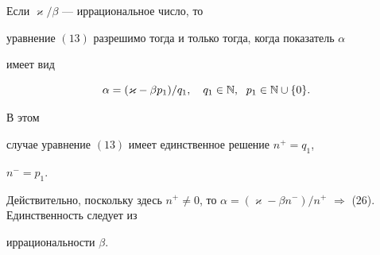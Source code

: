 \begin{lem}


Если $\varkappa/\beta$ --- иррациональное число, то


уравнение $(13)$ разрешимо тогда и только тогда, когда показатель $\alpha$


имеет вид


\begin{equation}


\alpha = (\varkappa-\beta


p_{1})/q_{1},\quad q_{1}\in\Bbb N,\ \;p_{1}\in\Bbb N\cup\{0\}.


\end{equation}


В этом


случае уравнение $(13)$ имеет единственное решение $n^{+} = q_1$,


$n^{-} = p_1$.


\end{lem}





Действительно, поскольку здесь $n^+\ne0$, то $\alpha = (\varkappa - \beta


n^{-})/n^{+}$ $\Longrightarrow$ (26). Единственность следует из


иррациональности $\beta$.





